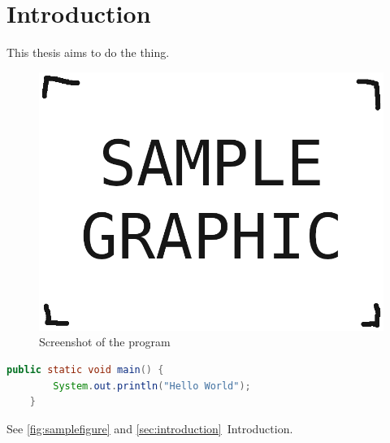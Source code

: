 \chapter{Introduction} \label{sec:introduction}

This thesis aims to do the thing\parencite{somewebsite}.

\begin{figure}[h]
	\includegraphics[width=\textwidth]{./grafiken/sample_graphic.png}
	\vskip0pt
	\caption{Screenshot of the program} \label{fig:samplefigure}
\end{figure}

\begin{lstlisting}[language=Java]
	public static void main() {
		System.out.println("Hello World");
	}
\end{lstlisting}

See \autoref{fig:samplefigure} and \autoref{sec:introduction}~Introduction.


